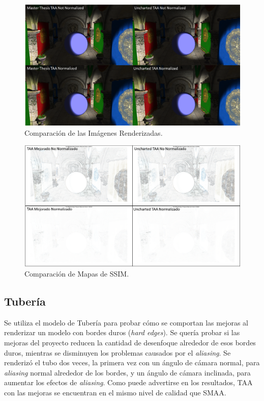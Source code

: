 \documentclass[pregrado]{tesis-usb} %
\begin{document}
\begin{figure}[!htb]
	\centering
	\includegraphics[scale=0.41]{images/results/sharpen_test_render.png}
	\caption{Comparación de las Imágenes Renderizadas.}\label{fig:sharpen_render}
\end{figure}

\begin{figure}[!htb]
	\centering
	\includegraphics[scale=0.9]{images/results/sharpen_test_ssim.png}
	\caption{Comparación de Mapas de SSIM.}\label{fig:sharpen_ssim}
\end{figure}

\FloatBarrier
\subsection{Tubería}
Se utiliza el modelo de Tubería para probar cómo se comportan las mejoras al renderizar un modelo con bordes duros (\textit{hard edges}). Se quería probar si las mejoras del proyecto reducen la cantidad de desenfoque alrededor de esos bordes duros, mientras se disminuyen los problemas causados por el \textit{aliasing}. Se renderizó el tubo dos veces, la primera vez con un ángulo de cámara normal, para \textit{aliasing} normal alrededor de los bordes, y un ángulo de cámara inclinada, para aumentar los efectos de \textit{aliasing}. Como puede advertirse en los resultados, TAA con las mejoras se encuentran en el mismo nivel de calidad que SMAA.
\end{document}
